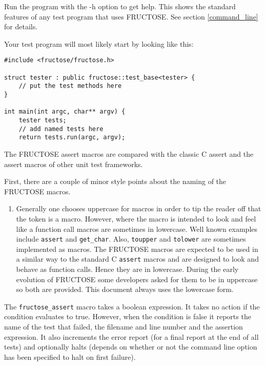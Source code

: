 \documentclass{book}
\begin{document}
Run the program with the -h option to get help. This shows the standard features
of any test program that uses FRUCTOSE. See section \ref{command_line} for
details.



Your test program will most likely start by looking like this:

\begin{verbatim}
#include <fructose/fructose.h>

struct tester : public fructose::test_base<tester> {
    // put the test methods here
}

int main(int argc, char** argv) {
    tester tests;
    // add named tests here
    return tests.run(argc, argv);
\end{verbatim}


The FRUCTOSE assert macros are compared with the classic C assert
and the assert macros of other unit test frameworks.

First, there are a couple of minor style points
about the naming of the FRUCTOSE macros.

\begin{enumerate}
\item Generally one chooses uppercase for macros in order to tip the reader
off that the token is a macro. However, where the macro is intended to look
and feel like a function call macros are sometimes in lowercase. 
Well known examples include {\tt assert} and {\tt get\_char}. 
Also, {\tt toupper} and {\tt tolower} are sometimes implemented as macros.
The FRUCTOSE macros are expected to be used in a similar way to the standard
C {\tt assert} macros and are designed to look and behave as function calls.
Hence they are in lowercase. During the early evolution of FRUCTOSE some
developers asked for them to be in uppercase so both are provided.
This document always uses the lowercase form.
\end{enumerate}

The {\tt fructose\_assert} macro takes a boolean expression.
It takes no action if the condition evaluates to true. 
However, when the condition is false
it reports the name of the test that failed, the filename and line number
and the assertion expression. It also increments the error report (for a final
report at the end of all tests) and optionally halts (depends on whether or
not the command line option has been specified to halt on first failure).
\end{document}
